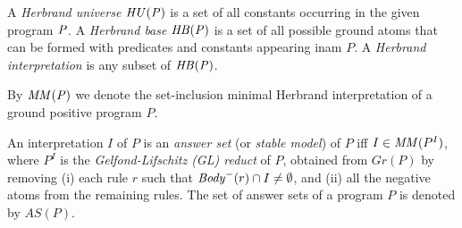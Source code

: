 \begin{definition}
A \emph{Herbrand universe}  $\mathit{HU(P)}$ is a set of all constants occurring in the given program $\mathit{P}$. A \emph{Herbrand base}  $\mathit{HB(P)}$ is a set of all possible ground atoms that can be formed with predicates and constants appearing inam $P$. A \emph{Herbrand interpretation} is any subset of $\mathit{HB(P)}$.
\end{definition}

 By $\mathit{MM(P)}$ we denote the set-inclusion minimal Herbrand interpretation of a ground positive program $P$.
\begin{definition}
An interpretation $I$ of $P$ is an \emph{answer set} (or \emph{stable model}) of $P$ iff $I \in \mathit{MM}(P^I)$, where $P^I$ is the \emph{Gelfond-Lifschitz (GL) reduct} of $P$, obtained from $Gr(P)$ by removing (i) each rule $r$ such that $\mathit{Body}^-(r) \cap I\neq\emptyset$, and (ii) all the negative atoms from the remaining rules. The set of answer sets of a program $P$ is denoted by $AS(P)$.
\end{definition}
%
            

